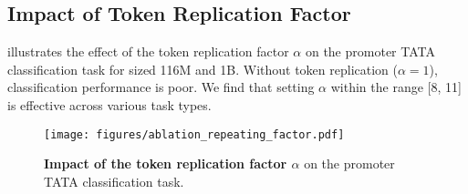 \subsection{Impact of Token Replication Factor}
 illustrates the effect of the token replication factor $\alpha$ on the promoter TATA classification task for \method sized 116M and
1B. Without token replication ($\alpha=1$), classification performance is poor. We find that setting $\alpha$ within the range [8, 11] is effective across various task types.
\begin{figure}[h!]
    \centering
    \texttt{[image: figures/ablation\_repeating\_factor.pdf]}
    \vspace{-2em} %
    \caption{\textbf{Impact of the token replication factor $\alpha$} on the promoter TATA classification task.}
    \label{fig:repearting_factor}
\end{figure}




